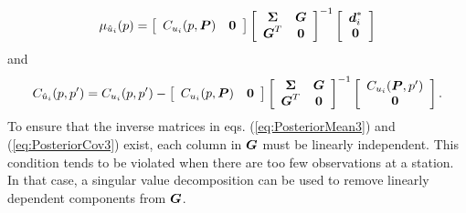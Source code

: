 \documentclass[extra,mreferee]{gji}
\begin{document}
 \begin{equation}\label{eq:PosteriorMean3}
\mu_{\hat{u}_i}(p) = \left[\begin{array}{cc}
                         C_{u_i}(p,\mitbf{P}) & \mitbf{0} \\
                         \end{array}\right]
                   \left[\begin{array}{cc}
                         \mitbf{\Sigma} & \mitbf{G} \\
                         \mitbf{G}^T  & \mitbf{0} \\
                         \end{array}\right]^{-1}
                   \left[\begin{array}{c}
                         \mitbf{d}^*_i \\
                         \mitbf{0} \\
                         \end{array}\right]
\end{equation}    
and
\begin{equation}\label{eq:PosteriorCov3}
C_{\hat{u}_i}(p,p') = C_{u_i}(p,p') - 
                    \left[\begin{array}{cc}
                          C_{u_i}(p,\mitbf{P}) & \mitbf{0} \\
                          \end{array}\right]
                    \left[\begin{array}{cc}
                          \mitbf{\Sigma} & \mitbf{G} \\
                          \mitbf{G}^T  & \mitbf{0} \\
                          \end{array}\right]^{-1}
                    \left[\begin{array}{c}
                          C_{u_i}(\mitbf{P},p') \\
                          \mitbf{0} \\
                          \end{array}\right].
\end{equation}
To ensure that the inverse matrices in eqs. (\ref{eq:PosteriorMean3}) and (\ref{eq:PosteriorCov3}) exist, each column in $\mitbf{G}$ must be linearly independent. This condition tends to be violated when there are too few observations at a station. In that case, a singular value decomposition can be used to remove linearly dependent components from $\mitbf{G}$.   
\end{document}
